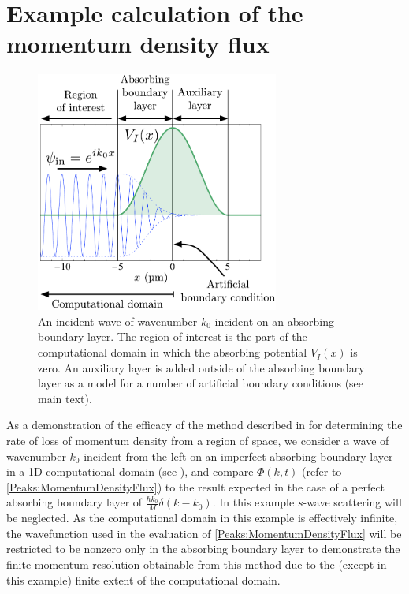 \section{Example calculation of the momentum density flux}
\label{MethodsAppendix:MomentumDensityFluxExampleCalculation}

\begin{figure}
    \centering
    \includegraphics[width=8cm]{AbsorbingBoundaryLayerScattering}
    \caption{\label{MethodsAppendix:AbsorbingBoundaryLayerScattering} An incident wave of wavenumber $k_0$ incident on an absorbing boundary layer. The region of interest is the part of the computational domain in which the absorbing potential $V_I(x)$ is zero. An auxiliary layer is added outside of the absorbing boundary layer as a model for a number of artificial boundary conditions (see main text).}
\end{figure}

As a demonstration of the efficacy of the method described in  for determining the rate of loss of momentum density from a region of space, we consider a wave of wavenumber $k_0$ incident from the left on an imperfect absorbing boundary layer in a 1D computational domain (see ), and compare $\Phi(k, t)$ (refer to \eqref{Peaks:MomentumDensityFlux}) to the result expected in the case of a perfect absorbing boundary layer of $\displaystyle \frac{\hbar k_0}{M}\delta(k - k_0)$. In this example $s$-wave scattering will be neglected. As the computational domain in this example is effectively infinite, the wavefunction used in the evaluation of \eqref{Peaks:MomentumDensityFlux} will be restricted to be nonzero only in the absorbing boundary layer to demonstrate the finite momentum resolution obtainable from this method due to the (except in this example) finite extent of the computational domain.

